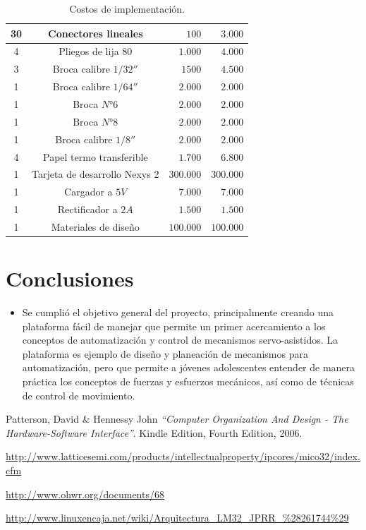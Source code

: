 \documentclass[twocolumn]{IEEEtran}
\begin{document}
\begin{table}[H]
\begin{tabular}{|c|c|r|r|}
 30 & Conectores lineales & $100$ & $3.000$ \\ \hline
 4 & Pliegos de lija $80$ & $1.000$ & $4.000$ \\ \hline
 3 & Broca calibre $1/32''$ & $1500$ & $4.500$ \\ \hline
 1 & Broca calibre $1/64''$ & $2.000$ & $2.000$ \\ \hline
 1 & Broca $N°6$ & $2.000$ & $2.000$ \\ \hline
 1 & Broca $N°8$ & $2.000$ & $2.000$ \\ \hline
 1 & Broca calibre $1/8''$ & $2.000$ & $2.000$ \\ \hline
 4 & Papel termo transferible & $1.700$ & $6.800$ \\ \hline
 1 & Tarjeta de desarrollo Nexys 2 & $300.000$ & $300.000$ \\ \hline
 1 & Cargador a $5V$ & $7.000$ & $7.000$ \\ \hline
 1 & Rectificador a $2A$ & $1.500$ & $1.500$ \\ \hline
 1 & Materiales de diseño & $100.000$ & $100.000$ \\ \hline
    \end{tabular}
	\caption{Costos de implementación.}
	\label{tab2}
\end{table}


\section{Conclusiones}
\begin{itemize}
 \item Se cumplió el objetivo general del proyecto, principalmente  creando una plataforma fácil de manejar que permite un primer acercamiento a los conceptos de automatización y control de mecanismos servo-asistidos. La plataforma es ejemplo de diseño y planeación de mecanismos para automatización, pero que permite a jóvenes adolescentes entender de manera práctica los conceptos de fuerzas y esfuerzos mecánicos, así como de técnicas de control de movimiento.
\end{itemize}


\begin{thebibliography}{99}
 Patterson, David \& Hennessy John
{\em "`Computer Organization And Design - The Hardware-Software Interface"'}.
Kindle Edition, Fourth Edition, 2006.

 \url{http://www.latticesemi.com/products/intellectualproperty/ipcores/mico32/index.cfm}

 \url{http://www.ohwr.org/documents/68}

 \url{http://www.linuxencaja.net/wiki/Arquitectura_LM32_JPRR_%28261744%29}
\end{thebibliography}
\end{document}
